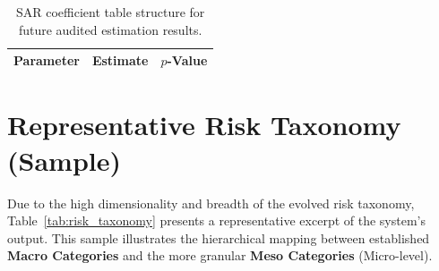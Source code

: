 \documentclass[11pt, a4paper]{article}
\begin{document}
\begin{table}[H]
\centering
\caption{SAR coefficient table structure for future audited estimation results.}
\label{tab:sar_batch_template}
\vspace{0.2cm}
\renewcommand{\arraystretch}{1.15}
\begin{tabular}{lll}
\toprule
\textbf{Parameter} & \textbf{Estimate} & \textbf{$p$-Value} \\
\midrule
\bottomrule
\end{tabular}
\end{table}

\newpage

\section{Representative Risk Taxonomy (Sample)}
Due to the high dimensionality and breadth of the evolved risk taxonomy, Table~\ref{tab:risk_taxonomy} presents a representative excerpt of the system's output. This sample illustrates the hierarchical mapping between established \textbf{Macro Categories} and the more granular \textbf{Meso Categories} (Micro-level).
\small
\end{document}
